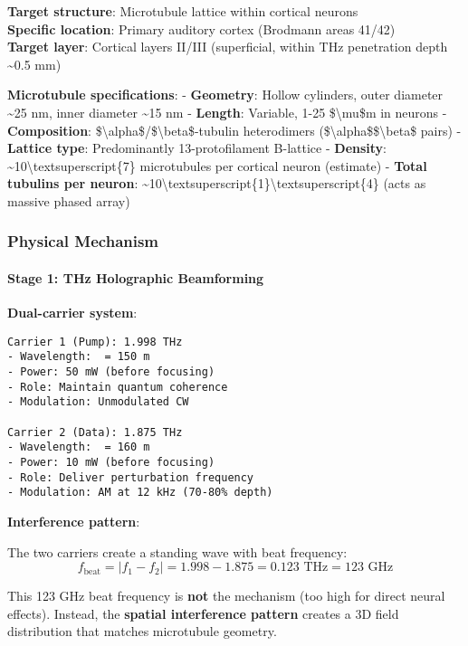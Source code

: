 \textbf{Target structure}: Microtubule lattice within cortical neurons\\
\textbf{Specific location}: Primary auditory cortex (Brodmann areas
41/42)\\
\textbf{Target layer}: Cortical layers II/III (superficial, within THz
penetration depth \textasciitilde0.5 mm)

\textbf{Microtubule specifications}: - \textbf{Geometry}: Hollow
cylinders, outer diameter \textasciitilde25 nm, inner diameter
\textasciitilde15 nm - \textbf{Length}: Variable, 1-25
\$\textbackslash mu\$m in neurons - \textbf{Composition}:
\$\textbackslash alpha\$/\$\textbackslash beta\$-tubulin heterodimers
(\$\textbackslash alpha\$\$\textbackslash beta\$ pairs) -
\textbf{Lattice type}: Predominantly 13-protofilament B-lattice -
\textbf{Density}: \textasciitilde10\textbackslash textsuperscript\{7\}
microtubules per cortical neuron (estimate) - \textbf{Total tubulins per
neuron}:
\textasciitilde10\textbackslash textsuperscript\{1\}\textbackslash textsuperscript\{4\}
(acts as massive phased array)

\subsubsection{Physical Mechanism}\label{physical-mechanism}

\paragraph{Stage 1: THz Holographic
Beamforming}\label{stage-1-thz-holographic-beamforming}

\textbf{Dual-carrier system}:

\begin{verbatim}
Carrier 1 (Pump): 1.998 THz
- Wavelength:  = 150 m
- Power: 50 mW (before focusing)
- Role: Maintain quantum coherence
- Modulation: Unmodulated CW

Carrier 2 (Data): 1.875 THz  
- Wavelength:  = 160 m
- Power: 10 mW (before focusing)
- Role: Deliver perturbation frequency
- Modulation: AM at 12 kHz (70-80% depth)
\end{verbatim}

\textbf{Interference pattern}:

The two carriers create a standing wave with beat frequency:
\[f_{\text{beat}} = |f_1 - f_2| = 1.998 - 1.875 = 0.123 \text{ THz} = 123 \text{ GHz}\]

This 123 GHz beat frequency is \textbf{not} the mechanism (too high for
direct neural effects). Instead, the \textbf{spatial interference
pattern} creates a 3D field distribution that matches microtubule
geometry.


